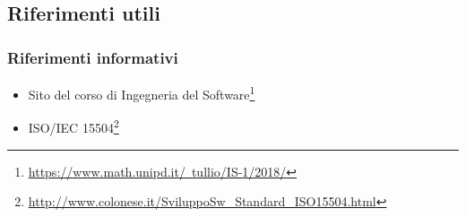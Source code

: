 \subsection{Riferimenti utili}
\subsubsection{Riferimenti informativi}
\begin{itemize}
	\item Sito del corso di Ingegneria del Software\footnote{\href{https://www.math.unipd.it/~tullio/IS-1/2018/}{https://www.math.unipd.it/~tullio/IS-1/2018/}}
	\item ISO/IEC 15504\footnote{\href{http://www.colonese.it/SviluppoSw_Standard_ISO15504.html}{http://www.colonese.it/SviluppoSw\_{}Standard\_{}ISO15504.html}}
\end{itemize}
